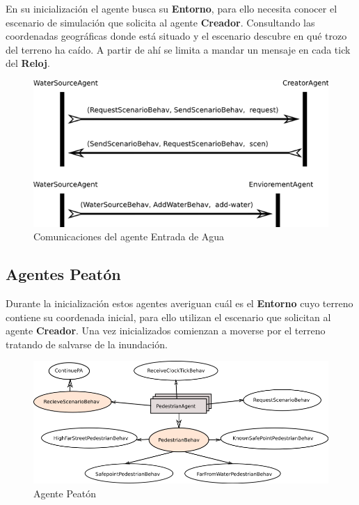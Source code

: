 En su inicialización el agente busca su {\bf Entorno}, para ello necesita
conocer el escenario de simulación que solicita al agente {\bf Creador}.
Consultando las coordenadas geográficas donde está situado y el escenario
descubre en qué trozo del terreno ha caído. A partir de ahí se limita a mandar
un mensaje en cada tick del {\bf Reloj}.

\begin{figure}[H]
 \centering
 \includegraphics[width=120mm]{figuras/cap5/com_water_source.png}
 \caption{Comunicaciones del agente Entrada de Agua}
\end{figure}

\subsection*{Agentes Peatón}

Durante la inicialización estos agentes averiguan cuál es el {\bf Entorno} cuyo
terreno contiene su coordenada inicial, para ello utilizan el escenario que
solicitan al agente {\bf Creador}. Una vez inicializados comienzan a moverse
por el terreno tratando de salvarse de la inundación.

\begin{figure}[H]
 \centering
 \includegraphics[width=135mm]{figuras/cap5/ag_pedestrian.png}
 \caption{Agente Peatón}
\end{figure}

